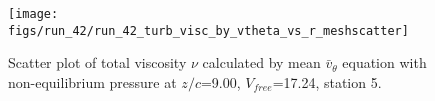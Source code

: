 \begin{figure}[H]
\centering
\texttt{[image: figs/run\_42/run\_42\_turb\_visc\_by\_vtheta\_vs\_r\_meshscatter]}
\caption{Scatter plot of total viscosity $\nu$ calculated by mean $\bar{v}_{\theta}$ equation with non-equilibrium pressure at $z/c$=9.00, $V_{free}$=17.24, station 5.}
\label{fig:run_42_turb_visc_by_vtheta_vs_r_meshscatter}
\end{figure}


